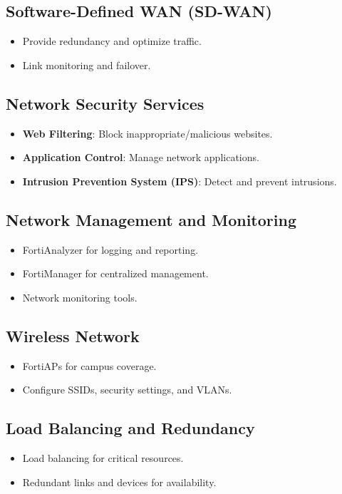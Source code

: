 \documentclass[12pt]{report}
\begin{document}
\subsection{Software-Defined WAN (SD-WAN)}
\begin{itemize}
    \item Provide redundancy and optimize traffic.
    \item Link monitoring and failover.
\end{itemize}

\subsection{Network Security Services}
\begin{itemize}
    \item \textbf{Web Filtering}: Block inappropriate/malicious websites.
    \item \textbf{Application Control}: Manage network applications.
    \item \textbf{Intrusion Prevention System (IPS)}: Detect and prevent intrusions.
\end{itemize}

\subsection{Network Management and Monitoring}
\begin{itemize}
    \item FortiAnalyzer for logging and reporting.
    \item FortiManager for centralized management.
    \item Network monitoring tools.
\end{itemize}

\subsection{Wireless Network}
\begin{itemize}
    \item FortiAPs for campus coverage.
    \item Configure SSIDs, security settings, and VLANs.
\end{itemize}

\subsection{Load Balancing and Redundancy}
\begin{itemize}
    \item Load balancing for critical resources.
    \item Redundant links and devices for availability.
\end{itemize}
\end{document}
